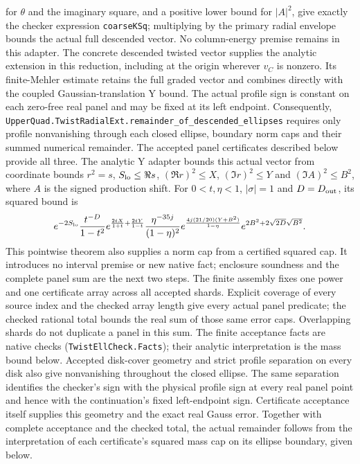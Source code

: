 \documentclass[11pt,a4paper]{article}
\newcommand{\lean}[1]{\texttt{\small #1}}
\begin{document}
for $\theta$ and the imaginary square, and a positive lower bound for
$|A|^2$, give exactly the checker expression \texttt{coarseKSq}; multiplying
by the primary radial envelope bounds the actual full descended vector.
No column-energy premise remains in this adapter.
The concrete descended twisted vector supplies the analytic extension
in this reduction, including at the origin wherever $v_C$ is nonzero.
Its finite-Mehler estimate retains the full graded vector and combines
directly with the coupled Gaussian-translation Y bound. The actual profile
sign is constant on each zero-free real panel and may be fixed at its left
endpoint. Consequently,
\lean{UpperQuad.TwistRadialExt.remainder\_of\_descended\_ellipses} requires only
profile nonvanishing through each closed ellipse, boundary norm caps and
their summed numerical remainder. The accepted panel certificates described
below provide all three.
The analytic Y adapter bounds this actual vector from coordinate bounds
$r^2=s$, $S_{\rm lo}\le\Re s$, $(\Re r)^2\le X$, $(\Im r)^2\le Y$ and
$(\Im A)^2\le B^2$, where $A$ is the signed production shift. For
$0<t,\eta<1$, $|\sigma|=1$ and $D=D_{\rm out}$, its squared bound is
\[
 e^{-2S_{\rm lo}}\frac{t^{-D}}{1-t^2}
 e^{\frac{2tX}{1+t}+\frac{2tY}{1-t}}
 \frac{\eta^{-35j}}{(1-\eta)^2}
 e^{\frac{4j(21/20)(Y+B^2)}{1-\eta}}
 e^{2B^2+2\sqrt{2D}\sqrt{B^2}}.
\]
This pointwise theorem also supplies a norm cap from a certified squared cap.
It introduces no interval premise or new native fact; enclosure soundness and
the complete panel sum are the next two steps.
The finite assembly fixes one power and one certificate array across all
accepted shards. Explicit coverage of every source index and the checked
array length give every actual panel predicate; the checked rational total
bounds the real sum of those same error caps. Overlapping shards do not
duplicate a panel in this sum. The finite acceptance facts are native checks
(\lean{TwistEllCheck.Facts}); their analytic interpretation is the mass bound
below.
Accepted disk-cover geometry and strict profile separation on every disk
also give nonvanishing throughout the closed ellipse. The same separation
identifies the checker's sign with the physical profile sign at every real
panel point and hence with the continuation's fixed left-endpoint sign.
Certificate acceptance itself supplies this geometry and the exact
real Gauss error. Together with complete acceptance and the checked total,
the actual remainder follows from the interpretation of each
certificate's squared mass cap on its ellipse boundary, given below.
\end{document}
